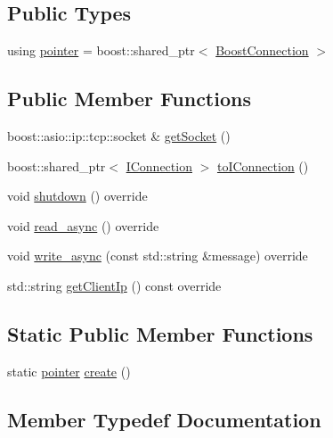 \subsection*{Public Types}
\begin{DoxyCompactItemize}
\item 
using \mbox{\hyperlink{classBoostConnection_acaf86877128a2df13130110cf72de640}{pointer}} = boost\+::shared\+\_\+ptr$<$ \mbox{\hyperlink{classBoostConnection}{Boost\+Connection}} $>$
\end{DoxyCompactItemize}
\subsection*{Public Member Functions}
\begin{DoxyCompactItemize}
\item 
boost\+::asio\+::ip\+::tcp\+::socket \& \mbox{\hyperlink{classBoostConnection_a5b83b6847a7a522439fb6f66fd11b9e5}{get\+Socket}} ()
\item 
boost\+::shared\+\_\+ptr$<$ \mbox{\hyperlink{classIConnection}{I\+Connection}} $>$ \mbox{\hyperlink{classBoostConnection_a3262569e07575555bff604a7f9f6c803}{to\+I\+Connection}} ()
\item 
void \mbox{\hyperlink{classBoostConnection_a576ca28ef2f8f335ee1a0ccab64cc55b}{shutdown}} () override
\item 
void \mbox{\hyperlink{classBoostConnection_a8b117337238e2652adecde8971c1ab93}{read\+\_\+async}} () override
\item 
void \mbox{\hyperlink{classBoostConnection_abe7200e60f8b4d909a057f85ca9569db}{write\+\_\+async}} (const std\+::string \&message) override
\item 
std\+::string \mbox{\hyperlink{classBoostConnection_a648ba5a8674fc95b4cab8c94225a19e9}{get\+Client\+Ip}} () const override
\end{DoxyCompactItemize}
\subsection*{Static Public Member Functions}
\begin{DoxyCompactItemize}
\item 
static \mbox{\hyperlink{classBoostConnection_acaf86877128a2df13130110cf72de640}{pointer}} \mbox{\hyperlink{classBoostConnection_a2f020a5317924e126c1495a86816f8ef}{create}} ()
\end{DoxyCompactItemize}


\subsection{Member Typedef Documentation}
\mbox{\label{classBoostConnection_acaf86877128a2df13130110cf72de640}} 

